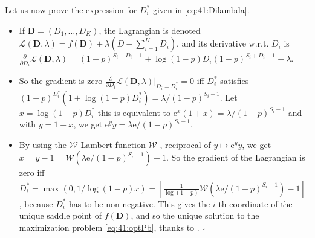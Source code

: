 Let us now prove the expression for $D_i^*$ given in \eqref{eq:41:Dilambda}.
\begin{itemize}
	\item
	If $\boldsymbol{D} = (D_1,\dots,D_{K})$,
    the Lagrangian is denoted $\mathcal{L}(\boldsymbol{D}, \lambda) = f(\boldsymbol{D}) + \lambda(D - \sum_{i=1}^{K} D_i)$, and its derivative w.r.t. $D_i$ is
    $\frac{\partial}{\partial D_i} \mathcal{L}(\boldsymbol{D}, \lambda) = (1-p)^{S_i + D_i - 1} + \log(1 - p) D_i (1-p)^{S_i + D_i - 1} - \lambda$.

    \item
    So the gradient is zero $\frac{\partial}{\partial D_i} \mathcal{L}(\boldsymbol{D}, \lambda) |_{D_i=D_i^*} = 0$
    iff $D_i^*$ satisfies $(1-p)^{D_i^*}( 1 + \log(1-p) D_i^*) = \lambda / (1-p)^{S_i - 1}$. Let $x = \log(1-p) D_i^*$ this is equivalent to $\mathrm{e}^{x}(1 + x) = \lambda / (1-p)^{S_i - 1}$
    and with $y = 1 + x$, we get $\mathrm{e}^{y}y = \lambda\mathrm{e} / (1-p)^{S_i - 1}$.

	\item
    By using the $\mathcal{W}$-Lambert function $\mathcal{W}$ \cite{Corless96}, reciprocal of $y \mapsto \mathrm{e}^{y}y$, we get $x = y - 1 = \mathcal{W}(\lambda\mathrm{e} / (1-p)^{S_i - 1}) - 1$.
    So the gradient of the Lagrangian is zero iff $D_i^* = \max(0, 1/\log(1-p) x) = \left[ \frac{1}{\log(1-p)}\mathcal{W}(\lambda\mathrm{e} / (1-p)^{S_i - 1}) - 1\right]^{+}$, because $D_i^*$ has to be non-negative.
    This gives the $i$-th coordinate of the unique saddle point of $f(\boldsymbol{D})$,
    and so the unique solution to the maximization problem \eqref{eq:41:optPb}, thanks to \cite[Theorem 1]{Luenberger68}.
    \hfill{}$\square$
\end{itemize}


